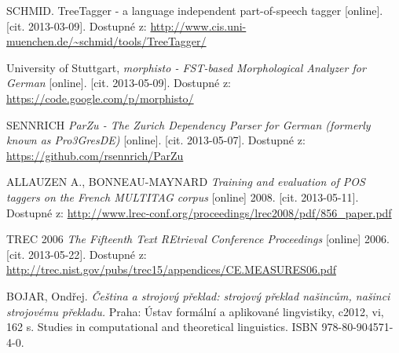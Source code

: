 \begin{thebibliography}{99}
{\sc SCHMID}. TreeTagger - a language independent part-of-speech tagger
[online].
  [cit. 2013-03-09].
  Dostupné z: \url{http://www.cis.uni-muenchen.de/~schmid/tools/TreeTagger/}
 
University of Stuttgart, \emph{morphisto - FST-based Morphological Analyzer for German}
[online].
  [cit. 2013-05-09].
  Dostupné z: \url{https://code.google.com/p/morphisto/}
  
{\sc SENNRICH} \emph{ ParZu - The Zurich Dependency Parser for German (formerly known as Pro3GresDE)}
[online].
  [cit. 2013-05-07].
  Dostupné z: \url{https://github.com/rsennrich/ParZu}

{\sc ALLAUZEN} A., {\sc BONNEAU-MAYNARD} \emph{Training and evaluation of POS taggers on the French MULTITAG corpus}
[online] 2008.
  [cit. 2013-05-11].
  Dostupné z: \url{http://www.lrec-conf.org/proceedings/lrec2008/pdf/856_paper.pdf}

{\sc TREC 2006} \emph{The Fifteenth Text REtrieval Conference Proceedings}
[online] 2006.
  [cit. 2013-05-22].
  Dostupné z: \url{http://trec.nist.gov/pubs/trec15/appendices/CE.MEASURES06.pdf}
  



{\sc BOJAR}, Ondřej. \emph{Čeština a strojový překlad: strojový překlad našincům, našinci strojovému překladu.} Praha: Ústav formální a aplikované lingvistiky, c2012, vi, 162 s. Studies in computational and theoretical linguistics. ISBN 978-80-904571-4-0.
 



  


 
  

\end{thebibliography}
 

